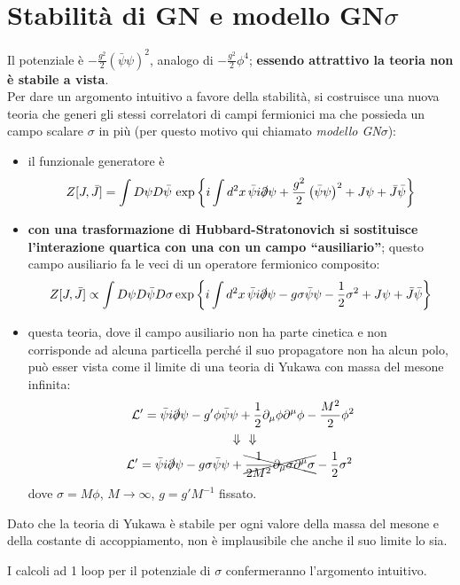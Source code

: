 \documentclass[a4paper,11pt]{amsart}
\newcommand{\nl}{\vskip 0.3cm}
\newcommand{\np}{\vskip 1.3cm}
\newcommand{\psibar}{\bar{\psi}}
\newcommand{\demu}[1]{\partial#1{\mu}}
\newcommand{\ssection}[2]{\section{ \texorpdfstring{\textbf{#1}}{#2} }}
\begin{document}
\ssection{Stabilità di GN e modello GN$\sigma$}{Stabilità}
 Il potenziale è $- \frac{g^2}{2}\left(\psibar\psi\right)^2$, analogo di $- \frac{g^2}{2}\phi^4$; \textbf{essendo attrattivo la teoria non è stabile
 a vista}.\\
 Per dare un argomento intuitivo a favore della stabilità, si costruisce una nuova teoria che generi gli stessi correlatori di campi fermionici ma che possieda 
 un campo scalare $\sigma$ in più (per questo motivo qui chiamato \emph{modello GN$\sigma$}): 
 \begin{itemize}
  \item il funzionale generatore è \[ Z[J,\bar{J}] = \int D\psi D\psibar\,\exp\left\{i\int d^2x\,  \psibar i\slashed{\partial}\psi + \frac{g^2}{2}\left(\psibar\psi\right)^2 + J\psi + \bar{J}\bar{\psi}\right\}\]
  \item \textbf{con una trasformazione di Hubbard-Stratonovich si sostituisce l'interazione quartica con una con un campo ``ausiliario''}; questo campo ausiliario fa le veci di un operatore fermionico composito:
   \[ 
    Z[J,\bar{J}] \propto \int D\psi D\psibar D\sigma \exp\left\{i\int d^2x\,  \psibar i\slashed{\partial}\psi - g\sigma\psibar\psi -\frac{1}{2}\sigma^2 + J\psi + \bar{J}\bar{\psi}\right\}
   \]
  \item questa teoria, dove il campo ausiliario non ha parte cinetica e non corrisponde ad alcuna particella perché il suo propagatore non ha alcun polo, può esser vista
  come il limite di una teoria di Yukawa con massa del mesone infinita:
  \begin{align*}
   \mathcal{L'} =  \psibar i\slashed{\partial}\psi - g'\phi\psibar&\psi + \frac{1}{2}\demu{_}\phi\demu{^}\phi-\frac{M^2}{2}\phi^2\\
  &\Downarrow\ \ \Downarrow\\
   \mathcal{L'} = \psibar i\slashed{\partial}\psi - g\sigma\psibar\psi& + \xcancel{\frac{1}{2M^2}\demu{_}\sigma\demu{^}\sigma} -\frac{1}{2}\sigma^2
  \end{align*}
 dove $\sigma = M\phi$, $M\to\infty$, $g=g'M^{-1}$ fissato.
\end{itemize}
Dato che la teoria di Yukawa è stabile per ogni valore della massa del mesone e della costante di accoppiamento, non è implausibile che anche il suo limite lo sia.
\nl

I calcoli ad 1 loop per il potenziale di $\sigma$ confermeranno l'argomento intuitivo.
\np
\end{document}
